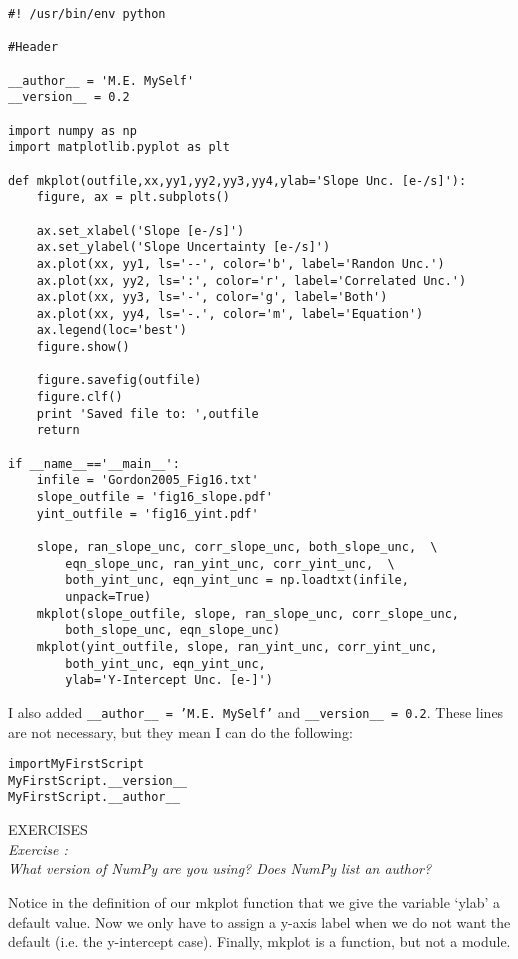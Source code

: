 \begin{verbatim}
#! /usr/bin/env python

#Header

__author__ = 'M.E. MySelf'
__version__ = 0.2

import numpy as np
import matplotlib.pyplot as plt

def mkplot(outfile,xx,yy1,yy2,yy3,yy4,ylab='Slope Unc. [e-/s]'):
    figure, ax = plt.subplots()

    ax.set_xlabel('Slope [e-/s]')
    ax.set_ylabel('Slope Uncertainty [e-/s]')
    ax.plot(xx, yy1, ls='--', color='b', label='Randon Unc.')
    ax.plot(xx, yy2, ls=':', color='r', label='Correlated Unc.')
    ax.plot(xx, yy3, ls='-', color='g', label='Both')
    ax.plot(xx, yy4, ls='-.', color='m', label='Equation')
    ax.legend(loc='best')
    figure.show()

    figure.savefig(outfile) 
    figure.clf()
    print 'Saved file to: ',outfile 
    return  
    
if __name__=='__main__': 
    infile = 'Gordon2005_Fig16.txt' 
    slope_outfile = 'fig16_slope.pdf'  
    yint_outfile = 'fig16_yint.pdf'  
    
    slope, ran_slope_unc, corr_slope_unc, both_slope_unc,  \
        eqn_slope_unc, ran_yint_unc, corr_yint_unc,  \
        both_yint_unc, eqn_yint_unc = np.loadtxt(infile, 
        unpack=True) 
    mkplot(slope_outfile, slope, ran_slope_unc, corr_slope_unc,  
        both_slope_unc, eqn_slope_unc) 
    mkplot(yint_outfile, slope, ran_yint_unc, corr_yint_unc,  
        both_yint_unc, eqn_yint_unc,
        ylab='Y-Intercept Unc. [e-]')
\end{verbatim}

I also added \texttt{\_\_author\_\_ = 'M.E. MySelf'} and
\texttt{\_\_version\_\_ = 0.2}.  These lines are not necessary, but
they mean I can do the following:
\begin{alltt}
\pytab import MyFirstScript
\pytab MyFirstScript.__version__
\pytab MyFirstScript.__author__
\end{alltt}

{\color{blue} {\sf\small EXERCISES}} \\
{\it Exercise  :  \\
  What version of NumPy are you using?  Does NumPy list an author?
}

Notice in the definition of our mkplot function that we give the
variable `ylab' a default value.  Now we only have to assign a y-axis
label when we do not want the default (i.e. the y-intercept case).
Finally, {\sf \small mkplot} is a function, but not a module.

